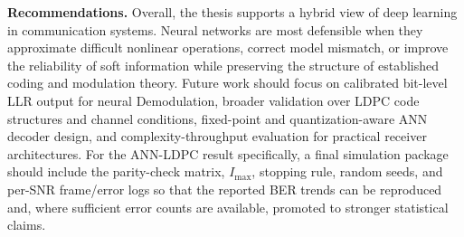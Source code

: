 \noindent\textbf{Recommendations.} Overall, the thesis supports a hybrid view of deep learning in communication systems. Neural networks are most defensible when they approximate difficult nonlinear operations, correct model mismatch, or improve the reliability of soft information while preserving the structure of established coding and modulation theory. Future work should focus on calibrated bit-level LLR output for neural Demodulation, broader validation over LDPC code structures and channel conditions, fixed-point and quantization-aware ANN decoder design, and complexity-throughput evaluation for practical receiver architectures. For the ANN-LDPC result specifically, a final simulation package should include the parity-check matrix, $I_{\max}$, stopping rule, random seeds, and per-SNR frame/error logs so that the reported BER trends can be reproduced and, where sufficient error counts are available, promoted to stronger statistical claims.

